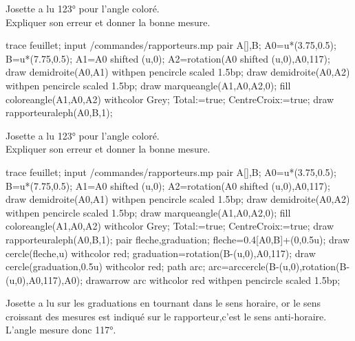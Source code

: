 \begin{exercice*}
   Josette a lu \ang{123} pour l'angle coloré.\\
   Expliquer son erreur et donner la bonne mesure.

   \begin{Geometrie}[CoinBG={(0,-3.5u)},CoinHD={(7.5u,4u)}]
      trace feuillet;
      input \persopath/commandes/rapporteurs.mp
      pair A[],B;
      A0=u*(3.75,0.5);
      B=u*(7.75,0.5);
      A1=A0 shifted (u,0); 
      A2=rotation(A0 shifted (u,0),A0,117);
      draw demidroite(A0,A1) withpen pencircle scaled 1.5bp;
      draw demidroite(A0,A2) withpen pencircle scaled 1.5bp;
      draw marqueangle(A1,A0,A2,0);
      fill coloreangle(A1,A0,A2) withcolor Grey;
      Total:=true;%
      CentreCroix:=true;%
      draw rapporteuraleph(A0,B,1);        
   \end{Geometrie}

   \dotfill
   
   \bigskip\dotfill
   
   \bigskip\dotfill
   
   \bigskip\dotfill
\end{exercice*}
\begin{corrige}
   Josette a lu \ang{123} pour l'angle coloré.\\
   Expliquer son erreur et donner la bonne mesure.

   \begin{Geometrie}[CoinBG={(0,-3.5u)},CoinHD={(7.5u,4u)}]
      trace feuillet;
      input \persopath/commandes/rapporteurs.mp
      pair A[],B;
      A0=u*(3.75,0.5);
      B=u*(7.75,0.5);
      A1=A0 shifted (u,0); 
      A2=rotation(A0 shifted (u,0),A0,117);
      draw demidroite(A0,A1) withpen pencircle scaled 1.5bp;
      draw demidroite(A0,A2) withpen pencircle scaled 1.5bp;
      draw marqueangle(A1,A0,A2,0);
      fill coloreangle(A1,A0,A2) withcolor Grey;
      Total:=true;%
      CentreCroix:=true;%
      draw rapporteuraleph(A0,B,1);        
      pair fleche,graduation;
      fleche=0.4[A0,B]+(0,0.5u);
      draw cercle(fleche,u) withcolor red;
      graduation=rotation(B-(u,0),A0,117);
      draw cercle(graduation,0.5u) withcolor red;
      path arc;
      arc=arccercle(B-(u,0),rotation(B-(u,0),A0,117),A0);
      drawarrow arc withcolor red withpen pencircle scaled 1.5bp;
   \end{Geometrie}

   {\red Josette a lu sur les graduations en tournant dans le sens horaire, or le sens croissant des mesures est indiqué sur le rapporteur,c'est le sens anti-horaire.
   L'angle mesure donc \ang{117}.}
\end{corrige}
   